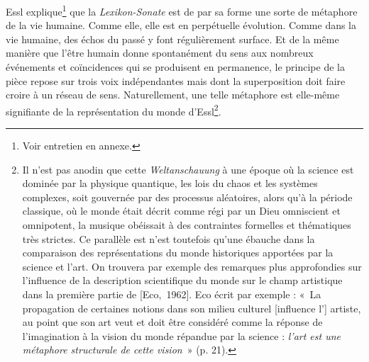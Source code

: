 \documentclass[a4paper,12pt]{article}
\newcommand{\guill}[1]{«~#1~»}
\newcommand{\cicite}[1]{{\footnotesize[#1]}}
\begin{document}
Essl explique\footnote{Voir entretien en annexe.} que la \emph{Lexikon-Sonate} est de par sa forme une sorte de métaphore de la vie humaine. Comme elle, elle est en perpétuelle évolution. Comme dans la vie humaine, des échos du passé y font régulièrement surface. Et de la même manière que l'être humain donne spontanément du sens aux nombreux événements et coïncidences qui se produisent en permanence, le principe de la pièce repose sur trois voix indépendantes mais dont la superposition doit faire croire à un réseau de sens. Naturellement, une telle métaphore est elle-même signifiante de la représentation du monde d'Essl\footnote{Il n'est pas anodin que cette \emph{Weltanschauung} à une époque où la science est dominée par la physique quantique, les lois du chaos et les systèmes complexes, soit gouvernée par des processus aléatoires, alors qu'à la période classique, où le monde était décrit comme régi par un Dieu omniscient et omnipotent, la musique obéissait à des contraintes formelles et thématiques très strictes. Ce parallèle est n'est toutefois qu'une ébauche dans la comparaison des représentations du monde historiques apportées par la science et l'art. On trouvera par exemple des remarques plus approfondies sur l'influence de la description scientifique du monde sur le champ artistique dans la première partie de \cicite{Eco,~1962}. Eco écrit par exemple : \guill{La propagation de certaines notions dans son milieu culturel [influence l'] artiste, au point que son art veut et doit être considéré comme la réponse de l'imagination à la vision du monde répandue par la science : \emph{l'art est une métaphore structurale de cette vision}} (p. 21).}.
\end{document}
